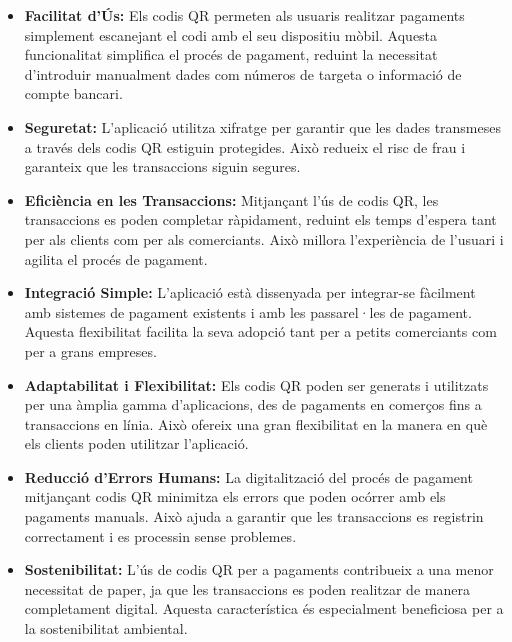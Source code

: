 \documentclass[a4paper,12pt,twoside]{ThesisStyle}
\begin{document}
\begin{itemize}
    \item \textbf{Facilitat d'Ús:} Els codis QR permeten als usuaris realitzar pagaments simplement escanejant el codi amb el seu dispositiu mòbil. Aquesta funcionalitat simplifica el procés de pagament, reduint la necessitat d'introduir manualment dades com números de targeta o informació de compte bancari.

    \item \textbf{Seguretat:} L'aplicació utilitza xifratge per garantir que les dades transmeses a través dels codis QR estiguin protegides. Això redueix el risc de frau i garanteix que les transaccions siguin segures.

    \item \textbf{Eficiència en les Transaccions:} Mitjançant l'ús de codis QR, les transaccions es poden completar ràpidament, reduint els temps d'espera tant per als clients com per als comerciants. Això millora l'experiència de l'usuari i agilita el procés de pagament.

    \item \textbf{Integració Simple:} L'aplicació està dissenyada per integrar-se fàcilment amb sistemes de pagament existents i amb les passarel·les de pagament. Aquesta flexibilitat facilita la seva adopció tant per a petits comerciants com per a grans empreses.

    \item \textbf{Adaptabilitat i Flexibilitat:} Els codis QR poden ser generats i utilitzats per una àmplia gamma d'aplicacions, des de pagaments en comerços fins a transaccions en línia. Això ofereix una gran flexibilitat en la manera en què els clients poden utilitzar l'aplicació.

    \item \textbf{Reducció d'Errors Humans:} La digitalització del procés de pagament mitjançant codis QR minimitza els errors que poden ocórrer amb els pagaments manuals. Això ajuda a garantir que les transaccions es registrin correctament i es processin sense problemes.

    \item \textbf{Sostenibilitat:} L'ús de codis QR per a pagaments contribueix a una menor necessitat de paper, ja que les transaccions es poden realitzar de manera completament digital. Aquesta característica és especialment beneficiosa per a la sostenibilitat ambiental.

\end{itemize}
\end{document}

